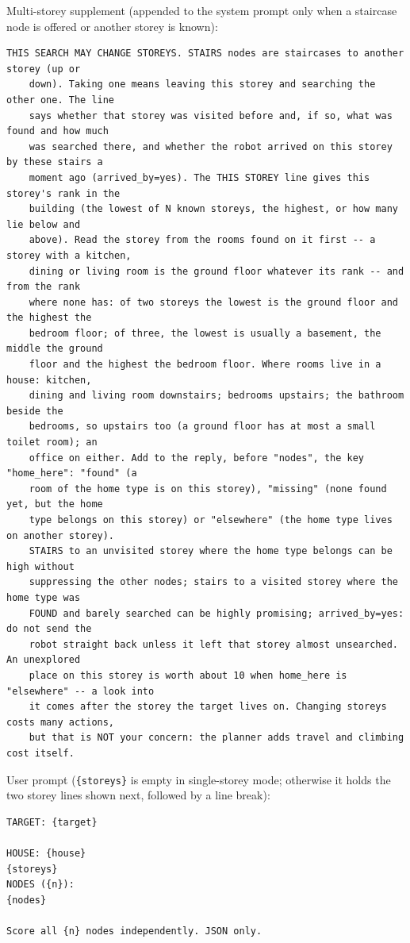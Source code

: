 \documentclass[10pt]{article}
\begin{document}
\noindent Multi-storey supplement (appended to the system prompt only when a staircase node is offered or another storey is known):
\begin{small}
\begin{verbatim}
THIS SEARCH MAY CHANGE STOREYS. STAIRS nodes are staircases to another storey (up or
    down). Taking one means leaving this storey and searching the other one. The line
    says whether that storey was visited before and, if so, what was found and how much
    was searched there, and whether the robot arrived on this storey by these stairs a
    moment ago (arrived_by=yes). The THIS STOREY line gives this storey's rank in the
    building (the lowest of N known storeys, the highest, or how many lie below and
    above). Read the storey from the rooms found on it first -- a storey with a kitchen,
    dining or living room is the ground floor whatever its rank -- and from the rank
    where none has: of two storeys the lowest is the ground floor and the highest the
    bedroom floor; of three, the lowest is usually a basement, the middle the ground
    floor and the highest the bedroom floor. Where rooms live in a house: kitchen,
    dining and living room downstairs; bedrooms upstairs; the bathroom beside the
    bedrooms, so upstairs too (a ground floor has at most a small toilet room); an
    office on either. Add to the reply, before "nodes", the key "home_here": "found" (a
    room of the home type is on this storey), "missing" (none found yet, but the home
    type belongs on this storey) or "elsewhere" (the home type lives on another storey).
    STAIRS to an unvisited storey where the home type belongs can be high without
    suppressing the other nodes; stairs to a visited storey where the home type was
    FOUND and barely searched can be highly promising; arrived_by=yes: do not send the
    robot straight back unless it left that storey almost unsearched. An unexplored
    place on this storey is worth about 10 when home_here is "elsewhere" -- a look into
    it comes after the storey the target lives on. Changing storeys costs many actions,
    but that is NOT your concern: the planner adds travel and climbing cost itself.
\end{verbatim}
\end{small}

\noindent User prompt (\texttt{\{storeys\}} is empty in single-storey mode; otherwise it holds the two storey lines shown next, followed by a line break):
\begin{small}
\begin{verbatim}
TARGET: {target}

HOUSE: {house}
{storeys}
NODES ({n}):
{nodes}

Score all {n} nodes independently. JSON only.
\end{verbatim}
\end{small}
\end{document}
